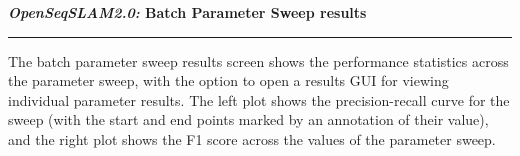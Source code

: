 \centerline{\textbf{\textit{OpenSeqSLAM2.0:} Batch Parameter Sweep results}}
\noindent\rule{\textwidth}{2pt}
\bigskip
\parbox{\textwidth}{The batch parameter sweep results screen shows the performance statistics across the parameter sweep, with the option to open a results GUI for viewing individual parameter results. The left plot shows the precision-recall curve for the sweep (with the start and end points marked by an annotation of their value), and the right plot shows the F1 score across the values of the parameter sweep. }
